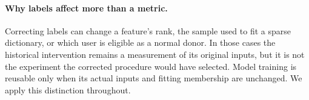 \paragraph{Why labels affect more than a metric.}
Correcting labels can change a feature's rank, the sample used to fit a sparse
dictionary, or which user is eligible as a normal donor. In those cases the
historical intervention remains a measurement of its original inputs, but it
is not the experiment the corrected procedure would have selected. Model
training is reusable only when its actual inputs and fitting membership are
unchanged. We apply this distinction throughout.
